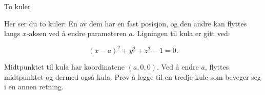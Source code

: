 \documentclass[no]{./../../common/SurferDesc}%
\begin{document}
\footnotesize
%
\begin{surferPage}
  \begin{surferTitle}To kuler\end{surferTitle}
   \begin{surferText}   
Her ser du to kuler: En av dem har en fast posisjon, og den andre kan flyttes langs $x$-aksen ved å endre parameteren $a$. 
Ligningen til kula er gitt ved:

\[(x-a)^2+y^2+z^2-1=0.\]


Midtpunktet til kula har koordinatene $(a,0,0)$. Ved å endre $a$, flyttes midtpunktet og dermed 
også kula. Prøv å legge til en tredje kule som beveger seg i en annen retning. 

     \end{surferText}
\end{surferPage}
\end{document}
